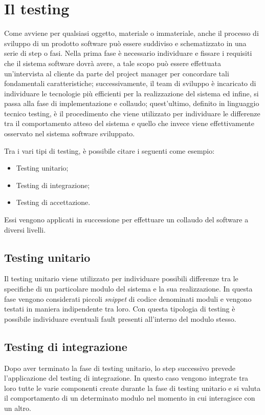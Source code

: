\fancyhead[C]{}
\fancyfoot[C]{\thepage}
\pagestyle{fancy}

\section{Il testing}
Come avviene per qualsiasi oggetto, materiale o immateriale, anche il
processo di sviluppo di un prodotto software può essere suddiviso e schematizzato in una serie di step o fasi. Nella prima fase è necessario individuare e fissare i requisiti che il sistema software dovrà avere, a tale scopo può essere effettuata
un’intervista al cliente da parte del project manager per concordare tali fondamentali caratteristiche; successivamente, il team di sviluppo è incaricato di individuare le tecnologie più efficienti per la realizzazione del sistema ed infine, si passa alla fase di implementazione e collaudo; quest’ultimo, definito in linguaggio
tecnico testing, è il procedimento che viene utilizzato per individuare le differenze tra il comportamento atteso del sistema e quello che invece viene effettivamente
osservato nel sistema software sviluppato.

Tra i vari tipi di testing, è possibile citare i seguenti come esempio:
\begin{itemize}
	\item Testing unitario;
	\item Testing di integrazione;
	\item Testing di accettazione.
\end{itemize}

Essi vengono applicati in successione per effettuare un collaudo del software
a diversi livelli.
\subsection{Testing unitario}
\cite{bruegge2009object}Il testing unitario viene utilizzato per individuare possibili differenze tra le specifiche di un particolare modulo del sistema e la sua realizzazione. In questa fase vengono considerati piccoli \emph{snippet} di codice denominati moduli e vengono testati in maniera indipendente tra loro. Con questa tipologia di testing è possibile
individuare eventuali fault presenti all’interno del modulo stesso.
\subsection{Testing di integrazione}
Dopo aver terminato la fase di testing unitario, lo step successivo prevede l’applicazione del testing di integrazione. In questo caso vengono integrate tra loro tutte le varie componenti create durante la fase di testing unitario e si valuta il comportamento di un determinato modulo nel momento in cui interagisce con un altro.

